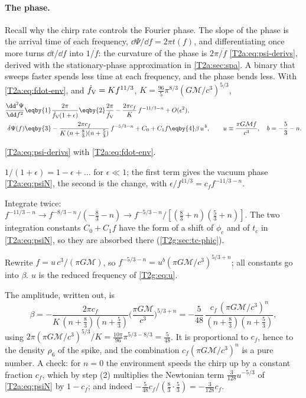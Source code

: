 \paragraph{The phase.}
Recall why the chirp rate controls the Fourier phase. The slope of the phase is the arrival time of each frequency, $\dd\Psi/\dd f=2\pi t(f)$, and differentiating once more turns $\dd t/\dd f$ into $1/\dot f$: the curvature of the phase is $2\pi/\dot f$ \eqref{T2a:eq:psi-derivs}, derived with the stationary-phase approximation in \cref{T2a:sec:spa}. A binary that sweeps faster spends less time at each frequency, and the phase bends less. With \eqref{T2a:eq:fdot-env}, and $\dot f_{\rm V}=Kf^{11/3}$, $K=\tfrac{96}{5}\pi^{8/3}(G\mathcal M/c^3)^{5/3}$,
\begin{align}
  \frac{\dd^2\Psi}{\dd f^2}
  &\eqby{1}\frac{2\pi}{\dot f_{\rm V}(1+\epsilon)}
  \eqby{2}\frac{2\pi}{\dot f_{\rm V}}-\frac{2\pi c_f}{K}\,f^{-11/3-n}+O(\epsilon^2),\nonumber\\
  \delta\Psi(f)
  &\eqby{3}-\frac{2\pi c_f}{K\,(n+\frac83)(n+\frac53)}\,f^{-5/3-n}+C_0+C_1f
  \eqby{4}\beta\,u^{\,b},\qquad u\equiv\frac{\pi G\mathcal Mf}{c^3},\quad b=-\frac53-n .\label{T2a:eq:ppe}
\end{align}
\begin{explain}
  \item \eqref{T2a:eq:psi-derivs} with \eqref{T2a:eq:fdot-env}.
  \item $1/(1+\epsilon)=1-\epsilon+\dots$ for $\epsilon\ll1$; the first term gives the vacuum phase \eqref{T2a:eq:psiN}, the second is the change, with $\epsilon/f^{11/3}=c_ff^{-11/3-n}$.
  \item Integrate twice: $f^{-11/3-n}\to f^{-8/3-n}/(-\frac83-n)\to f^{-5/3-n}/[(\frac83+n)(\frac53+n)]$. The two integration constants $C_0+C_1f$ have the form of a shift of $\phi_c$ and of $t_c$ in \eqref{T2a:eq:psiN}, so they are absorbed there (\cref{T2g:sec:tc-phic}).
  \item Rewrite $f=u\,c^3/(\pi G\mathcal M)$, so $f^{-5/3-n}=u^{b}(\pi G\mathcal M/c^3)^{5/3+n}$; all constants go into $\beta$. $u$ is the reduced frequency of \eqref{T2g:eq:u}.
\end{explain}
The amplitude, written out, is
\[
  \beta=-\frac{2\pi c_f}{K\,(n+\frac83)(n+\frac53)}\Big(\frac{\pi G\mathcal M}{c^3}\Big)^{5/3+n}
  =-\frac{5}{48}\,\frac{c_f\,(\pi G\mathcal M/c^3)^{n}}{(n+\frac83)(n+\frac53)},
\]
using $2\pi(\pi G\mathcal M/c^3)^{5/3}/K=\tfrac{10\pi}{96}\pi^{5/3-8/3}=\tfrac5{48}$. It is proportional to $c_f$, hence to the density $\rho_6$ of the spike, and the combination $c_f(\pi G\mathcal M/c^3)^n$ is a pure number. A check: for $n=0$ the environment speeds the chirp up by a constant fraction $c_f$, which by step (2) multiplies the Newtonian term $\tfrac3{128}u^{-5/3}$ of \eqref{T2a:eq:psiN} by $1-c_f$; and indeed $-\tfrac5{48}c_f/(\tfrac83\cdot\tfrac53)=-\tfrac3{128}c_f$.

